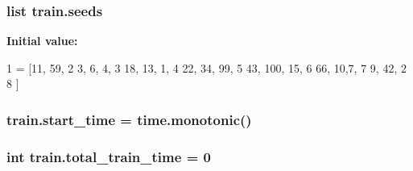 \subsubsection[{\texorpdfstring{seeds}{seeds}}]{\setlength{\rightskip}{0pt plus 5cm}list train.\+seeds}\hypertarget{namespacetrain_ab97948c2558b988c502b658b274d55bd}{}\label{namespacetrain_ab97948c2558b988c502b658b274d55bd}
{\bfseries Initial value\+:}
\begin{DoxyCode}
1 = [11, 59,
2           3, 6, 4,
3           18, 13, 1,
4           22, 34, 99,
5           43, 100, 15,
6           66, 10,7,
7           9, 42, 2
8           ]
\end{DoxyCode}
\subsubsection[{\texorpdfstring{start\+\_\+time}{start_time}}]{\setlength{\rightskip}{0pt plus 5cm}train.\+start\+\_\+time = time.\+monotonic()}\hypertarget{namespacetrain_ae49b53f438a208f1bfb27c7f72d09077}{}\label{namespacetrain_ae49b53f438a208f1bfb27c7f72d09077}
\subsubsection[{\texorpdfstring{total\+\_\+train\+\_\+time}{total_train_time}}]{\setlength{\rightskip}{0pt plus 5cm}int train.\+total\+\_\+train\+\_\+time = 0}\hypertarget{namespacetrain_a1d4f05c9ef9967e5ae700450c0d6df71}{}\label{namespacetrain_a1d4f05c9ef9967e5ae700450c0d6df71}
